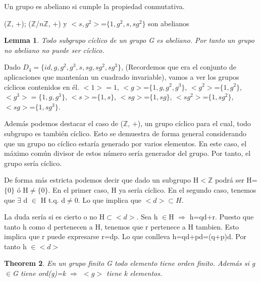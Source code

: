 \documentclass[a4paper,10pt]{apuntes}
\newtheorem{theorem}{Theorem}[section]
\newtheorem{lemma}[theorem]{Lemma}
\newenvironment{definition}[1][Definition]{\begin{trivlist}
\item[\hskip \labelsep {\bfseries #1}]}{\end{trivlist}}
\newenvironment{example}[1][Example]{\begin{trivlist}
\item[\hskip \labelsep {\bfseries #1}]}{\end{trivlist}}
\begin{document}
  \begin{definition}
   Un grupo es abeliano si cumple la propiedad conmutativa.
  \end{definition}

  \begin{example}
   ($\mathds{Z}$, +); ($\mathds{Z}$/$n\mathds{Z}$, +) y $<s,g^{2}>$=$\{1,g^{2},s,sg^{2}\}$ son abelianos
  \end{example}
  
  \begin{lemma}
   Todo subgrupo cíclico de un grupo G es abeliano. Por tanto un grupo no abeliano no puede ser cíclico.
  \end{lemma}

  \begin{example}
   Dado $D_{4}=\{id, g, g^{2}, g^{3}, s, sg, sg^{2},sg^{3}\}$, (Recordemos que era el conjunto de aplicaciones que mantenían un
   cuadrado invariable), vamos a ver los grupos cíclicos contenidos en él.
   $<1>={1}$, $<g>$=$\{1,g,g^{2}, g^{3}\}$, $<g^{2}>$=$\{1,g^{2}\}$, $<g^{3}>=\{1,g, g^{3}\}$, $<s>$=$\{1,s\}$, $<sg>$=$\{1, sg\}$, $<sg^{2}>$=$\{1, sg^{2}\}$, $<sg>$=$\{1, sg^{3}\}$.
   
   Además podemos destacar el caso de ($\mathds{Z}$, +), un grupo cíclico para el cual, todo subgrupo es también cíclico. Esto se demuestra
   de forma general considerando que un grupo no cíclico estaría generado por varios elementos. En este caso, el máximo común
   divisor de estos número sería generador del grupo. Por tanto, el grupo sería cíclico.
 
   De forma más estricta podemos decir que dado un subgrupo H$<\mathds{Z}$ podrá ser H=$\{0\}$ ó H$\neq\{0\}$. 
   En el primer caso, H ya sería cíclico. En el segundo caso, tenemos que $\exists$  d $\in$  H t.q. d$\neq$0. Lo que implica
   que $<d>\subset H$. 
   
   La duda sería si es cierto o no H$\subset <d>$. Sea h $\in$H  $\Rightarrow$  h=qd+r. Puesto que tanto h como d pertenecen a H,
   tenemos que r pertenece a H tambien. Esto implica que r puede expresarse r=dp. Lo que conlleva h=qd+pd=(q+p)d. Por tanto h $\in <d>$
   
  \end{example}

  \begin{theorem}
   En un grupo finito G todo elemento tiene orden finito. Además si g$\in$G tiene ord(g)=k $\Rightarrow$  $<g>$  tiene k elementos.
  \end{theorem}
\end{document}
